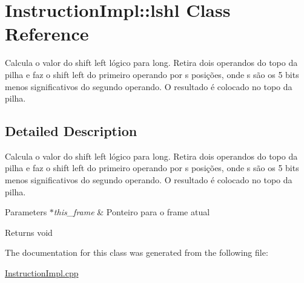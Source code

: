 \hypertarget{class_instruction_impl_1_1lshl}{}\section{Instruction\+Impl\+:\+:lshl Class Reference}
\label{class_instruction_impl_1_1lshl}


Calcula o valor do shift left lógico para long. Retira dois operandos do topo da pilha e faz o shift left do primeiro operando por s posições, onde s são os 5 bits menos significativos do segundo operando. O resultado é colocado no topo da pilha.  




\subsection{Detailed Description}
Calcula o valor do shift left lógico para long. Retira dois operandos do topo da pilha e faz o shift left do primeiro operando por s posições, onde s são os 5 bits menos significativos do segundo operando. O resultado é colocado no topo da pilha. 


\begin{DoxyParams}{Parameters}
{\em $\ast$this\+\_\+frame} & Ponteiro para o frame atual \\
\hline
\end{DoxyParams}
\begin{DoxyReturn}{Returns}
void 
\end{DoxyReturn}


The documentation for this class was generated from the following file\+:\begin{DoxyCompactItemize}
\item 
\hyperlink{_instruction_impl_8cpp}{Instruction\+Impl.\+cpp}\end{DoxyCompactItemize}
